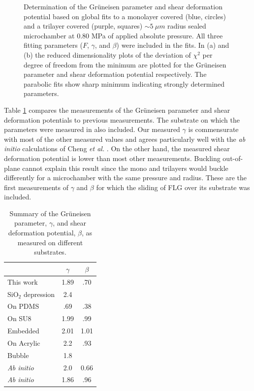 \begin{figure}
	\begin{center}
	
	\end{center}
	\caption[Determination of the Gr\"{u}neisen parameter and shear deformation potential]{\label{fig:fri:gammabeta}Determination of the Gr\"{u}neisen parameter and shear deformation potential based on global fits to a monolayer covered (blue, circles) and a trilayer covered (purple, squares) $\sim 5 \ \mu m$ radius sealed microchamber at 0.80 MPa of applied absolute pressure.
	All three fitting parameters ($F$, $\gamma$, and $\beta$) were included in the fits.
	In (a) and (b) the reduced dimensionality plots of the deviation of $\chi^2$ per degree of freedom from the minimum are plotted for the Gr\"{u}neisen parameter and shear deformation potential respectively.
	The parabolic fits show sharp minimum indicating strongly determined parameters.
	}
\end{figure}

Table \ref{tab:fri:gb} compares the measurements of the Gr\"{u}neisen parameter and shear deformation potentials to previous measurements.
The substrate on which the parameters were measured in also included.
Our measured $\gamma$ is commensurate with most of the other measured values and agrees particularly well with the \textit{ab initio} calculations of Cheng \textit{et al.} \cite{Cheng2011}.
On the other hand, the measured shear deformation potential is lower than most other measurements.
Buckling out-of-plane cannot explain this result since the mono and trilayers would buckle differently for a microchamber with the same pressure and radius.
These are the first measurements of $\gamma$ and $\beta$ for which the sliding of FLG over its substrate was included.

\begin{table}
	\begin{center}
	\begin{tabular}{l c  c }
		\hline
		\hline
		 & $\gamma$ & $\beta$ \\
		 \hline
		 This work & 1.89 & .70 \\
		 $\mathrm{SiO_2}$ depression \cite{Metzger2010} & 2.4 & \\
		 On PDMS \cite{Huang2009} & .69 & .38 \\
		 On SU8 \cite{Mohiuddin2009} & 1.99 & .99\\
		 Embedded \cite{Frank2010} & 2.01 & 1.01 \\
		 On Acrylic \cite{Yoon2011} & 2.2 & .93\\
		 Bubble \cite{Zabel2012} & 1.8 \\
		\textit{Ab initio} \cite{Thomsen2002} & 2.0 & 0.66 \\
		\textit{Ab initio} \cite{Cheng2011} & 1.86 & .96\\
		 \hline
		 \hline
	\end{tabular}
	\end{center}
	\caption[Summary of the Gr\"{u}neisen parameter and shear deformation potential as measured on different substrates]{\label{tab:fri:gb} Summary of the Gr\"{u}neisen parameter, $\gamma$, and shear deformation potential, $\beta$, as measured on different substrates.}
\end{table}

